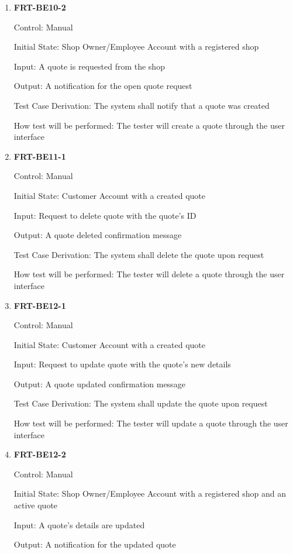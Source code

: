 \documentclass[12pt, titlepage]{article}
\begin{document}
\begin{enumerate}
	\item \textbf{FRT-BE10-2}

	      Control: Manual

	      Initial State: Shop Owner/Employee Account with a registered shop

	      Input: A quote is requested from the shop

	      Output: A notification for the open quote request

	      Test Case Derivation: The system shall notify that a quote was created

	      How test will be performed: The tester will create a quote through the user interface

	\item \textbf{FRT-BE11-1}

	      Control: Manual

	      Initial State: Customer Account with a created quote

	      Input: Request to delete quote with the quote's ID

	      Output: A quote deleted confirmation message

	      Test Case Derivation: The system shall delete the quote upon request

	      How test will be performed: The tester will delete a quote through the user interface

	\item \textbf{FRT-BE12-1}

	      Control: Manual

	      Initial State: Customer Account with a created quote

	      Input: Request to update quote with the quote's new details

	      Output: A quote updated confirmation message

	      Test Case Derivation: The system shall update the quote upon request

	      How test will be performed: The tester will update a quote through the user interface

	\item \textbf{FRT-BE12-2}

	      Control: Manual

	      Initial State: Shop Owner/Employee Account with a registered shop and an active quote

	      Input: A quote's details are updated

	      Output: A notification for the updated quote


\end{enumerate}
\end{document}
